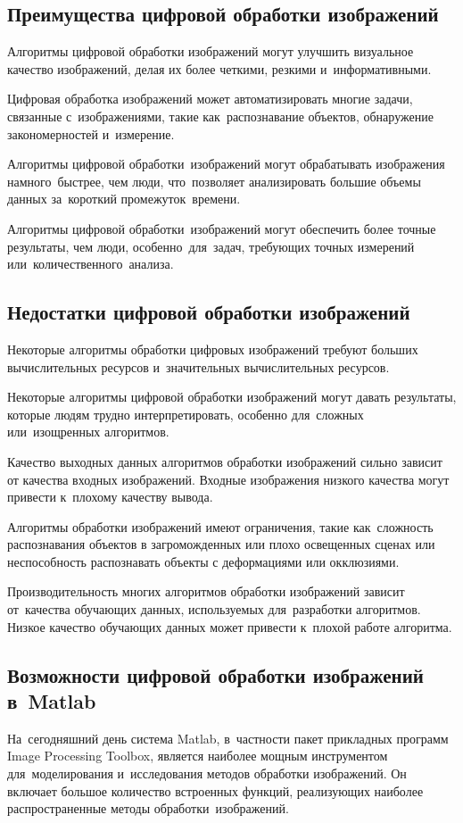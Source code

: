 \documentclass{ou}
\begin{document}
\subsection{Преимущества цифровой обработки изображений}
Алгоритмы цифровой обработки изображений могут улучшить визуальное качество изображений, делая их более четкими, резкими и~информативными.

Цифровая обработка изображений может автоматизировать многие задачи, связанные с~изображениями, такие как~распознавание объектов, обнаружение закономерностей и~измерение.

Алгоритмы цифровой обработки~изображений могут обрабатывать изображения намного~быстрее, чем люди, что~позволяет анализировать большие объемы данных за~короткий промежуток~времени.

Алгоритмы цифровой обработки~изображений могут обеспечить более точные результаты, чем люди, особенно~для~задач, требующих точных измерений или~количественного~анализа.
\subsection{Недостатки цифровой обработки изображений}
Некоторые алгоритмы обработки цифровых изображений требуют больших вычислительных ресурсов и~значительных вычислительных ресурсов.

Некоторые алгоритмы цифровой обработки изображений могут давать результаты, которые людям трудно интерпретировать, особенно для~сложных или~изощренных алгоритмов.

Качество выходных данных алгоритмов обработки изображений сильно зависит от качества входных изображений. Входные изображения низкого качества могут привести к~плохому качеству вывода.

Алгоритмы обработки изображений имеют ограничения, такие как~сложность распознавания объектов в загроможденных или плохо освещенных сценах или неспособность распознавать объекты с деформациями или окклюзиями.

Производительность многих алгоритмов обработки изображений зависит от~качества обучающих данных, используемых для~разработки алгоритмов. Низкое качество обучающих данных может привести к~плохой работе алгоритма.
\subsection{Возможности цифровой обработки изображений в~Matlab}
На~сегодняшний день система Matlab, в~частности пакет прикладных программ Image Processing Toolbox, является наиболее мощным инструментом для~моделирования и~исследования методов обработки изображений. Он включает большое количество встроенных функций, реализующих наиболее распространенные методы обработки~изображений.
\end{document}
